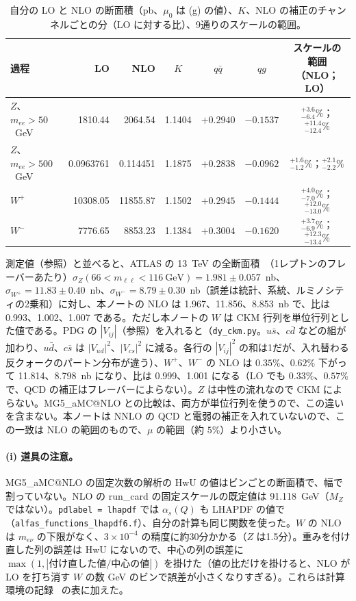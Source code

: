 \documentclass[a4paper,10pt]{ltjsarticle}
\makeatletter
\newcommand{\MGaMC}{MG5\_aMC@NLO}
\makeatother
\begin{document}
\begin{table}[htbp]
\centering\small
\caption{自分の LO と NLO の断面積（pb、$\mu_0$ は (g) の値）、$K$、NLO の補正のチャンネルごとの分（LO に対する比）、9通りのスケールの範囲。}
\label{tab:dyk}
\begin{tabular}{lrrcccc}
\toprule
過程 & LO & NLO & $K$ & $q\bar q$ & $qg$ & スケールの範囲（NLO；LO） \\
\midrule
$Z$、$m_{ee}>50$~GeV & 1810.44 & 2064.54 & 1.1404 & $+0.2940$ & $-0.1537$ & $^{+3.6}_{-6.4}\%$；$^{+11.4}_{-12.4}\%$ \\
$Z$、$m_{ee}>500$~GeV & 0.0963761 & 0.114451 & 1.1875 & $+0.2838$ & $-0.0962$ & $^{+1.6}_{-1.2}\%$；$^{+2.1}_{-2.2}\%$ \\
$W^+$ & 10308.05 & 11855.87 & 1.1502 & $+0.2945$ & $-0.1444$ & $^{+4.0}_{-7.0}\%$；$^{+12.0}_{-13.0}\%$ \\
$W^-$ & 7776.65 & 8853.23 & 1.1384 & $+0.3004$ & $-0.1620$ & $^{+3.7}_{-6.9}\%$；$^{+12.3}_{-13.4}\%$ \\
\bottomrule
\end{tabular}
\end{table}

測定値（参照）と並べると、ATLAS の 13~TeV の全断面積~\cite{atlaswz}（1レプトンのフレーバーあたり）$\sigma_Z(66<m_{\ell\ell}<116~\mathrm{GeV})=1.981\pm0.057$~nb、$\sigma_{W^+}=11.83\pm0.40$~nb、$\sigma_{W^-}=8.79\pm0.30$~nb（誤差は統計、系統、ルミノシティの2乗和）に対し、本ノートの NLO は 1.967、11.856、8.853~nb で、比は 0.993、1.002、1.007 である。ただし本ノートの $W$ は CKM 行列を単位行列とした値である。PDG の $|V_{ij}|$（参照）を入れると（\texttt{dy\_ckm.py}。$u\bar s$、$c\bar d$ などの組が加わり、$u\bar d$、$c\bar s$ は $|V_{ud}|^2$、$|V_{cs}|^2$ に減る。各行の $|V_{ij}|^2$ の和は1だが、入れ替わる反クォークのパートン分布が違う）、$W^+$、$W^-$ の NLO は $0.35\%$、$0.62\%$ 下がって 11.814、8.798~nb になり、比は 0.999、1.001 になる（LO でも $0.33\%$、$0.57\%$ で、QCD の補正はフレーバーによらない）。$Z$ は中性の流れなので CKM によらない。\MGaMC{} との比較は、両方が単位行列を使うので、この違いを含まない。本ノートは NNLO の QCD と電弱の補正を入れていないので、この一致は NLO の範囲のもので、$\mu$ の範囲（約 $5\%$）より小さい。

\paragraph{(i) 道具の注意。}\MGaMC{} の固定次数の解析の HwU の値はビンごとの断面積で、幅で割っていない。NLO の run\_card の固定スケールの既定値は 91.118~GeV（$M_Z$ ではない）。\texttt{pdlabel = lhapdf} では $\alpha_s(Q)$ も LHAPDF の値で（\texttt{alfas\_functions\_lhapdf6.f}）、自分の計算も同じ関数を使った。$W$ の NLO は $m_{e\nu}$ の下限がなく、$3\times10^{-4}$ の精度に約30分かかる（$Z$ は1.5分）。重みを付け直した列の誤差は HwU にないので、中心の列の誤差に $\max(1,|\text{付け直した値}/\text{中心の値}|)$ を掛けた（値の比だけを掛けると、NLO が LO を打ち消す $W$ の数 GeV のビンで誤差が小さくなりすぎる）。これらは計算環境の記録~\cite{env} の表に加えた。
\end{document}
